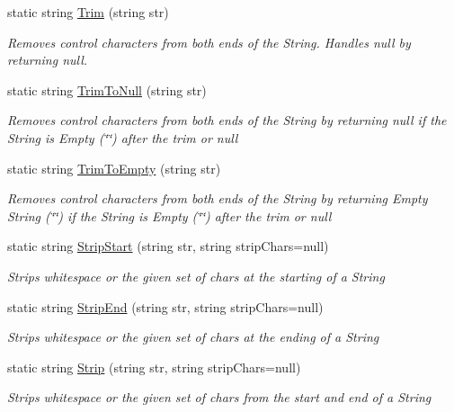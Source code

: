 \begin{DoxyCompactItemize}
\item 
static string \hyperlink{class_ultimate_1_1_utilities_1_1_string_utils_ab043a8946b985792458453405dcccdba}{Trim} (string str)
\begin{DoxyCompactList}\small\item\em Removes control characters from both ends of the String. Handles null by returning null. \end{DoxyCompactList}\item 
static string \hyperlink{class_ultimate_1_1_utilities_1_1_string_utils_a6adcd0f9610eba0b703f10b0588f8441}{Trim\+To\+Null} (string str)
\begin{DoxyCompactList}\small\item\em Removes control characters from both ends of the String by returning null if the String is Empty (\char`\"{}\char`\"{}) after the trim or null \end{DoxyCompactList}\item 
static string \hyperlink{class_ultimate_1_1_utilities_1_1_string_utils_a2360f342600736dbf996b8ff77c9aab3}{Trim\+To\+Empty} (string str)
\begin{DoxyCompactList}\small\item\em Removes control characters from both ends of the String by returning Empty String (\char`\"{}\char`\"{}) if the String is Empty (\char`\"{}\char`\"{}) after the trim or null \end{DoxyCompactList}\item 
static string \hyperlink{class_ultimate_1_1_utilities_1_1_string_utils_a0be8a4fe31d1ebff9b54d027bab6b5ec}{Strip\+Start} (string str, string strip\+Chars=null)
\begin{DoxyCompactList}\small\item\em Strips whitespace or the given set of chars at the starting of a String \end{DoxyCompactList}\item 
static string \hyperlink{class_ultimate_1_1_utilities_1_1_string_utils_a8f9c5b78990c3844ba523170d40ff453}{Strip\+End} (string str, string strip\+Chars=null)
\begin{DoxyCompactList}\small\item\em Strips whitespace or the given set of chars at the ending of a String \end{DoxyCompactList}\item 
static string \hyperlink{class_ultimate_1_1_utilities_1_1_string_utils_ad6a9280b7ddc0fe270f03c41ab72b862}{Strip} (string str, string strip\+Chars=null)
\begin{DoxyCompactList}\small\item\em Strips whitespace or the given set of chars from the start and end of a String \end{DoxyCompactList}\item 

\end{DoxyCompactItemize}
